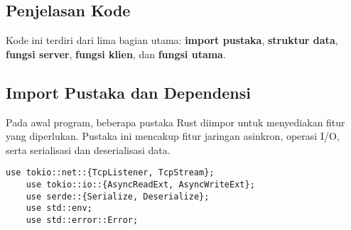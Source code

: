 \subsection{Penjelasan Kode}
Kode ini terdiri dari lima bagian utama: \textbf{import pustaka}, \textbf{struktur data}, \textbf{fungsi server}, \textbf{fungsi klien}, dan \textbf{fungsi utama}.


\subsection{Import Pustaka dan Dependensi}

Pada awal program, beberapa pustaka Rust diimpor untuk menyediakan fitur yang diperlukan. Pustaka ini mencakup fitur jaringan asinkron, operasi I/O, serta serialisasi dan deserialisasi data.

\begin{lstlisting}[style=RustStyle]
	use tokio::net::{TcpListener, TcpStream};
	use tokio::io::{AsyncReadExt, AsyncWriteExt};
	use serde::{Serialize, Deserialize};
	use std::env;
	use std::error::Error;
\end{lstlisting}

